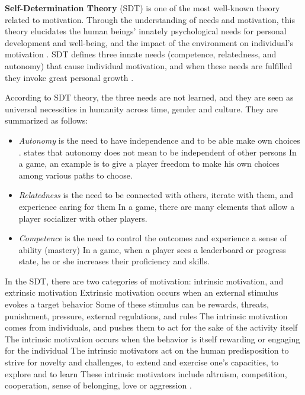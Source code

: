 \textbf{Self-Determination Theory} (SDT) is one of the most well-known theory related to motivation. Through the understanding of needs and motivation, this theory elucidates the human beings' innately psychological needs for personal development and well-being, and the impact of the environment on individual's motivation \cite{DeciRyan2010,RyanDeci2000}. SDT defines three innate needs (competence, relatedness, and autonomy) that cause individual motivation, and when these needs are fulfilled they invoke great personal growth \cite{ArazyGellatly2012}.

According to SDT theory, the three needs are not learned, and they are seen as universal necessities in humanity across time, gender and culture. They are summarized as follows:
\begin{itemize}
\item \emph{Autonomy} is the need to have independence and to be able make own choices \cite{DeciRyan2010}.  states that autonomy does not mean to be independent of other persons
In a game, an example is to give a player freedom to make his own choices among various paths to choose.
\item \emph{Relatedness} is the need to be connected with others, iterate with them, and experience caring for them \cite{BaumeisterLeary1995}
In a game, there are many elements that allow a player socializer with other players.
\item \emph{Competence} is the need to control the outcomes and experience a sense of ability (mastery) \cite{White1959}
In a game, when a player sees a leaderboard or progress state, he or she increases their proficiency and skills.
\end{itemize}

In the SDT, there are two categories of motivation: intrinsic motivation, and extrinsic motivation \cite{DeciVansteenkiste2004}
Extrinsic motivation occurs when an external stimulus evokes a target behavior
Some of these stimulus can be rewards, threats, punishment, pressure, external regulations, and rules
The intrinsic motivation comes from individuals, and pushes them to act for the sake of the activity itself \cite{DeciRyan2010}
The intrinsic motivation occurs when the behavior is itself rewarding or engaging for the individual
The intrinsic motivators act on the human predisposition to strive for novelty and challenges, to extend and exercise one's capacities, to explore and to learn \cite{RyanDeci2000}
These intrinsic motivators include altruism, competition, cooperation, sense of belonging, love or aggression \cite{Muntean2011}.

